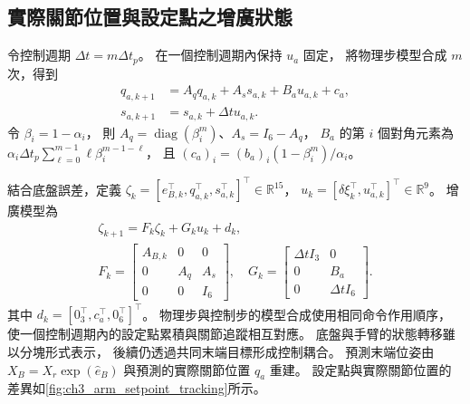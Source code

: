 \subsection{實際關節位置與設定點之增廣狀態}
\label{subsec:augmented_arm_state}

令控制週期 $\Delta t=m\Delta t_p$。
在一個控制週期內保持 $u_a$ 固定，
將物理步模型合成 $m$ 次，得到
\begin{equation}
    \begin{aligned}
        q_{a,k+1}&=A_q q_{a,k}+A_s s_{a,k}+B_a u_{a,k}+c_a,\\
        s_{a,k+1}&=s_{a,k}+\Delta t u_{a,k}.
    \end{aligned}
    \label{eq:ch3_control_step_arm_model}
\end{equation}
令 $\beta_i=1-\alpha_i$，
則 $A_q=\operatorname{diag}(\beta_i^m)$、$A_s=I_6-A_q$，
$B_a$ 的第 $i$ 個對角元素為
$\alpha_i\Delta t_p\sum_{\ell=0}^{m-1}\ell\beta_i^{m-1-\ell}$，
且 $(c_a)_i=(b_a)_i(1-\beta_i^m)/\alpha_i$。

結合底盤誤差，定義
$\zeta_k=[e_{B,k}^{\top},q_{a,k}^{\top},s_{a,k}^{\top}]^{\top}
\in\mathbb R^{15}$，
$u_k=[\delta\xi_k^{\top},u_{a,k}^{\top}]^{\top}\in\mathbb R^9$。
增廣模型為
\begin{equation}
    \begin{gathered}
    \zeta_{k+1}=F_k\zeta_k+G_ku_k+d_k,\\
    F_k=
    \begin{bmatrix}
        A_{B,k}&0&0\\
        0&A_q&A_s\\
        0&0&I_6
    \end{bmatrix},
    \quad
    G_k=
    \begin{bmatrix}
        \Delta t I_3&0\\
        0&B_a\\
        0&\Delta t I_6
    \end{bmatrix}.
    \end{gathered}
    \label{eq:ch3_augmented_prediction_dynamics}
\end{equation}
其中 $d_k=[0_3^{\top},c_a^{\top},0_6^{\top}]^{\top}$。
物理步與控制步的模型合成使用相同命令作用順序，
使一個控制週期內的設定點累積與關節追蹤相互對應。
底盤與手臂的狀態轉移雖以分塊形式表示，
後續仍透過共同末端目標形成控制耦合。
預測末端位姿由 $X_B=X_r\exp(\widehat e_B)$
與預測的實際關節位置 $q_a$ 重建。
設定點與實際關節位置的差異如\cref{fig:ch3_arm_setpoint_tracking}所示。

